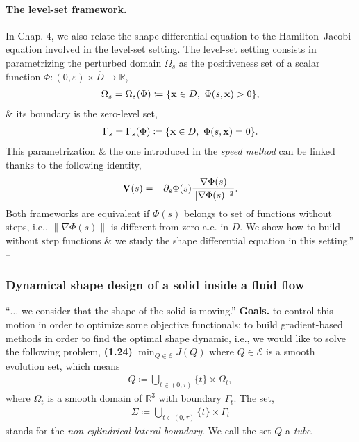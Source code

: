 \documentclass[oneside]{book}
\numberwithin{equation}{section}
\begin{document}
\paragraph{The level-set framework.} In Chap. 4, we also relate the shape differential equation to the Hamilton--Jacobi equation involved in the level-set setting. The level-set setting consists in parametrizing the perturbed domain $\Omega_s$ as the positiveness set of a scalar function $\Phi:(0,\varepsilon)\times\overline{D}\to\mathbb{R}$,
\begin{align*}
	\Omega_s = \Omega_s(\Phi)\coloneqq\{{\bf x}\in D,\ \Phi(s,{\bf x}) > 0\},
\end{align*}
\& its boundary is the zero-level set,
\begin{align*}
	\Gamma_s = \Gamma_s(\Phi)\coloneqq\{{\bf x}\in D,\ \Phi(s,{\bf x}) = 0\}.
\end{align*}
This parametrization \& the one introduced in the \textit{speed method} can be linked thanks to the following identity,
\begin{align*}
	{\bf V}(s) = -\partial_s\Phi(s)\frac{\nabla\Phi(s)}{\|\nabla\Phi(s)\|^2}.
\end{align*}
Both frameworks are equivalent if $\Phi(s)$ belongs to set of functions without steps, i.e., $\|\nabla\Phi(s)\|$ is different from zero a.e. in $D$. We show how to build without step functions \& we study the shape differential equation in this setting.'' -- \cite[Chap. 1, Subsect. 1.4.2, pp. 13--19]{Moubachir_Zolesio2006}

\subsubsection{Dynamical shape design of a solid inside a fluid flow}
``$\ldots$ we consider that the shape of the solid is moving.'' \textbf{Goals.} to control this motion in order to optimize some objective functionals; to build gradient-based methods in order to find the optimal shape dynamic, i.e., we would like to solve the following problem, \textbf{(1.24)} $\min_{Q\in\mathcal{E}} J(Q)$ where $Q\in\mathcal{E}$ is a smooth evolution set, which means
\begin{align*}
	Q\coloneqq\bigcup_{t\in(0,\tau)} \{t\}\times\Omega_t,
\end{align*}
where $\Omega_t$ is a smooth domain of $\mathbb{R}^3$ with boundary $\Gamma_t$. The set,
\begin{align*}
	\Sigma\coloneqq\bigcup_{t\in(0,\tau)} \{t\}\times\Gamma_t
\end{align*}
stands for the \textit{non-cylindrical lateral boundary}. We call the set $Q$ a \textit{tube}.
\end{document}
